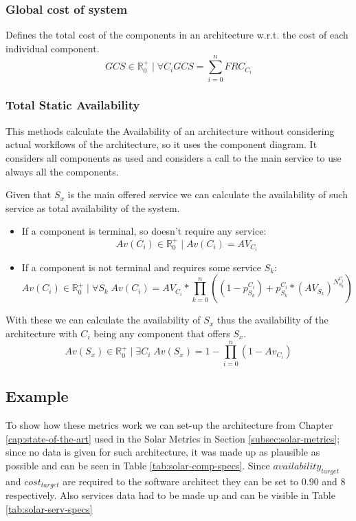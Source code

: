 \subsubsection{Global cost of system}
Defines the total cost of the components in an architecture w.r.t. the cost of each individual component.
\[ GCS \in \mathbb{R}^+_0 \; | \; \forall C_i GCS = \sum_{i=0}^{n} FRC_{C_i} \]
\subsubsection{Total Static Availability}
This methods calculate the Availability of an architecture without considering actual workflows of the architecture, so it uses the component diagram. It considers all components as used and considers a call to the main service to use always all the components.

Given that $S_x$ is the main offered service we can calculate the availability of such service as total availability of the system.
\begin{itemize}
\item If a component is terminal, so doesn't require any service:
\[ Av(C_{i}) \in \mathbb{R}^+_0 \; | \; Av(C_{i}) = AV_{C_{i}} \]
\item  If a component is not terminal and requires some service $S_k$:
\[ Av(C_{i}) \in \mathbb{R}^+_0 \; | \; \forall S_k \; Av(C_{i}) = AV_{C_{i}}*\prod_{k=0}^{n} ((1-p_{S_k}^{C_{i}}) + p_{S_k}^{C_{i}} * (AV_{S_k})^{N_{S_k}^{C_i}}) \]
\end{itemize}
With these we can calculate the availability of $S_x$ thus the availability of the architecture with $C_i$ being any component that offers $S_x$.
\[ Av(S_x) \in \mathbb{R}^+_0 \; | \; \exists C_i \; Av(S_x) = 1-\prod_{i=0}^{n}(1-Av_{C_i}) \]


\subsection{Example}
To show how these metrics work we can set-up the architecture from Chapter \ref{cap:state-of-the-art} used in the Solar Metrics in Section \ref{subsec:solar-metrics}; since no data is given for such architecture, it was made up as plausible as possible and can be seen in Table \ref{tab:solar-comp-specs}. Since $availability_{target}$ and $cost_{target}$ are required to the software architect they can be set to $0.90$ and $8$ respectively. Also services data had to be made up and can be visible in Table \ref{tab:solar-serv-specs}

